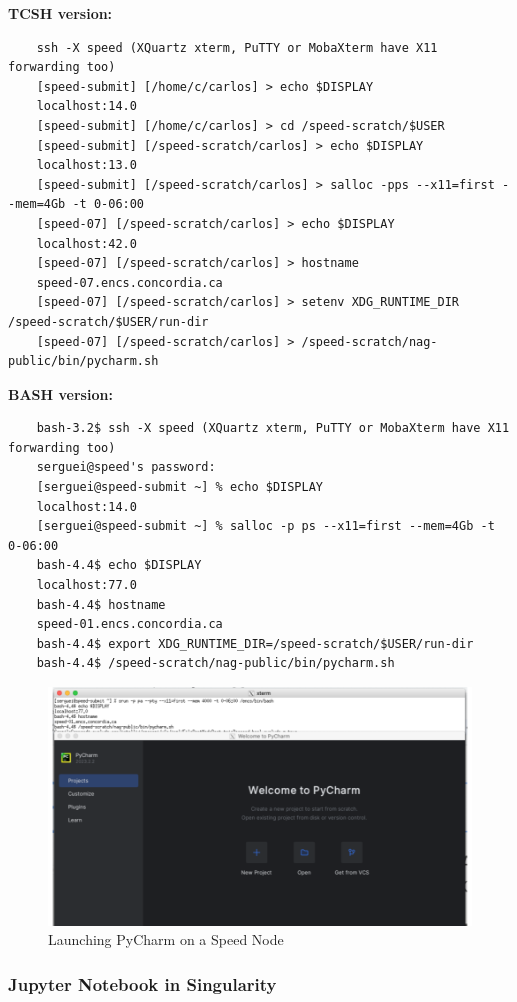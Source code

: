 \noindent \textbf{TCSH version:}
\small
\begin{verbatim}
	ssh -X speed (XQuartz xterm, PuTTY or MobaXterm have X11 forwarding too)
	[speed-submit] [/home/c/carlos] > echo $DISPLAY
	localhost:14.0
	[speed-submit] [/home/c/carlos] > cd /speed-scratch/$USER
	[speed-submit] [/speed-scratch/carlos] > echo $DISPLAY
	localhost:13.0
	[speed-submit] [/speed-scratch/carlos] > salloc -pps --x11=first --mem=4Gb -t 0-06:00
	[speed-07] [/speed-scratch/carlos] > echo $DISPLAY
	localhost:42.0
	[speed-07] [/speed-scratch/carlos] > hostname
	speed-07.encs.concordia.ca
	[speed-07] [/speed-scratch/carlos] > setenv XDG_RUNTIME_DIR /speed-scratch/$USER/run-dir
	[speed-07] [/speed-scratch/carlos] > /speed-scratch/nag-public/bin/pycharm.sh
\end{verbatim}
\normalsize
\noindent \textbf{BASH version:}
\small
\begin{verbatim}
	bash-3.2$ ssh -X speed (XQuartz xterm, PuTTY or MobaXterm have X11 forwarding too)
	serguei@speed's password: 
	[serguei@speed-submit ~] % echo $DISPLAY
	localhost:14.0
	[serguei@speed-submit ~] % salloc -p ps --x11=first --mem=4Gb -t 0-06:00 
	bash-4.4$ echo $DISPLAY
	localhost:77.0
	bash-4.4$ hostname
	speed-01.encs.concordia.ca
	bash-4.4$ export XDG_RUNTIME_DIR=/speed-scratch/$USER/run-dir
	bash-4.4$ /speed-scratch/nag-public/bin/pycharm.sh
\end{verbatim}
\normalsize

\begin{figure}[htpb]
	\includegraphics[width=\columnwidth]{images/pycharm}
	\caption{Launching PyCharm on a Speed Node}
	\label{fig:pycharm}
\end{figure}

\subsubsection{Jupyter Notebook in Singularity}
\label{sect:jupyter}


